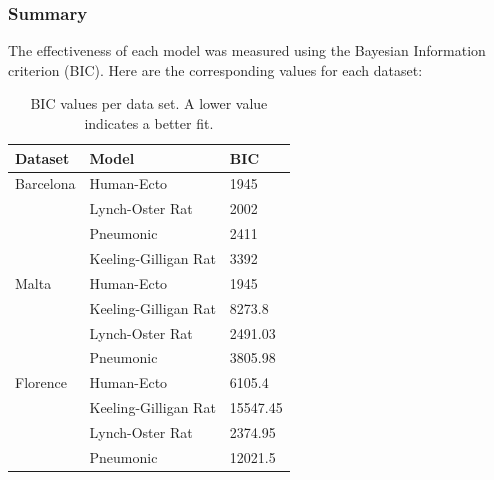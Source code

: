 \documentclass [letterpaper, 12pt] {article}
\begin{document}
\newpage

\subsubsection{Summary}

The effectiveness of each model was measured using the Bayesian Information criterion (BIC). Here are the corresponding values for each dataset:

\begin{table}[H]
\begin{center}
\begin{tabular}{|l|l|l|}
\hline
\textbf{Dataset} & \textbf{Model}       & \textbf{BIC} \\ \hline
Barcelona        & Human-Ecto           & 1945      \\ \cline{2-3}
                 & Lynch-Oster Rat      & 2002      \\ \cline{2-3}  
                 & Pneumonic            & 2411      \\ \cline{2-3} 
                 & Keeling-Gilligan Rat & 3392       \\ \hline
Malta            & Human-Ecto           & 1945         \\ \cline{2-3} 
                 & Keeling-Gilligan Rat & 8273.8       \\ \cline{2-3} 
                 & Lynch-Oster Rat      & 2491.03      \\ \cline{2-3} 
                 & Pneumonic            & 3805.98      \\ \hline
Florence         & Human-Ecto           & 6105.4       \\ \cline{2-3} 
                 & Keeling-Gilligan Rat & 15547.45     \\ \cline{2-3} 
                 & Lynch-Oster Rat      & 2374.95      \\ \cline{2-3} 
                 & Pneumonic            & 12021.5      \\ \hline
\end{tabular}
\end{center}
\caption{BIC values per data set. A lower value indicates a better fit.}
\end{table}
\end{document}
